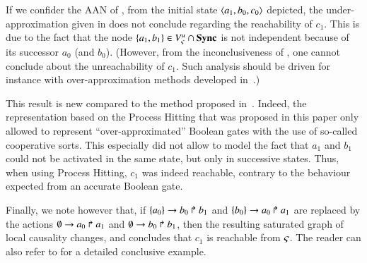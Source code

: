 \begin{example}
  If we confider the AAN of ,
  from the initial state $\mbox{$\langle a_1, b_0, c_0 \rangle$}$ depicted,
  the under-approximation given in 
  does not conclude regarding the reachability of $c_1$.
  This is due to the fact that the node $\{ a_1, b_1 \} \in {V_\varsigma^u} \cap \mathbf{Sync}$
  is not independent because of its successor $a_0$ (and $b_0$).
  (However, from the inconclusiveness of ,
  one cannot conclude about the unreachability of $c_1$.
  Such analysis should be driven for instance
  with over-approximation methods developed in~\cite{PMR12-MSCS}.)
  
  This result is new compared to the method proposed in~\cite{PMR12-MSCS}.
  Indeed, the representation based on the Process Hitting that was proposed
  in this paper only allowed to represent “over-approximated” Boolean gates
  with the use of so-called cooperative sorts.
  This especially did not allow to model the fact that $a_1$ and $b_1$ could not
  be activated in the same state, but only in successive states.
  Thus, when using Process Hitting, $c_1$ was indeed reachable,
  contrary to the behaviour expected from an accurate Boolean gate.
  
  Finally, we note however that,
  if $\{a_0\}\rightarrow b_0\Rsh b_1$ and $\{b_0\}\rightarrow a_0\Rsh a_1$ are replaced by the actions
  $\emptyset\rightarrow a_0\Rsh a_1$ and $\emptyset\rightarrow b_0\Rsh b_1$,
  then the resulting saturated graph of local causality changes, and
   concludes that $c_1$ is reachable from $\varsigma$.
  The reader can also refer to 
  for a detailed conclusive example.

\begin{figure}[tp]
  \centering
\end{figure}
\end{example}
